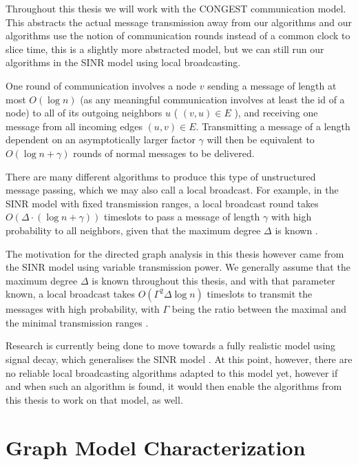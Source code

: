Throughout this thesis we will work with the CONGEST communication model. This abstracts the actual message transmission away from our algorithms and our algorithms use the notion of communication rounds instead of a common clock to slice time, this is a slightly more abstracted model, but we can still run our algorithms in the SINR model using local broadcasting.

One round of communication involves a node $v$ sending a message of length at most $O(\log n)$ (as any meaningful communication involves at least the id of a node) to all of its outgoing neighbors $u$ ( $(v, u) \in E$ ), and receiving one message from all incoming edges $(u, v) \in E$. Transmitting a message of a length dependent on an asymptotically larger factor $\gamma$ will then be equivalent to $O(\log n + \gamma)$ rounds of normal messages to be delivered.

There are many different algorithms to produce this type of unstructured message passing, which we may also call a local broadcast. For example, in the SINR model with fixed transmission ranges, a local broadcast round takes $O(\Delta \cdot (\log n + \gamma))$ timeslots to pass a message of length $\gamma$ with high probability to all neighbors, given that the maximum degree $\Delta$ is known \cite{dt-dncsi-10}. 

The motivation for the directed graph analysis in this thesis however came from the SINR model using variable transmission power. We generally assume that the maximum degree $\Delta$ is known throughout this thesis, and with that parameter known, a local broadcast takes $O(\Gamma^{2} \Delta \log n)$ timeslots to transmit the messages with high probability, with $\Gamma$ being the ratio between the maximal and the minimal transmission ranges \cite{DBLP:journals/corr/FuchsW14}. 

Research is currently being done to move towards a fully realistic model using signal decay, which generalises the SINR model \cite{DBLP:journals/corr/BodlaenderH14}. At this point, however, there are no reliable local broadcasting algorithms adapted to this model yet, however if and when such an algorithm is found, it would then enable the algorithms from this thesis to work on that model, as well.

\section{Graph Model Characterization}\label{section:graph}

